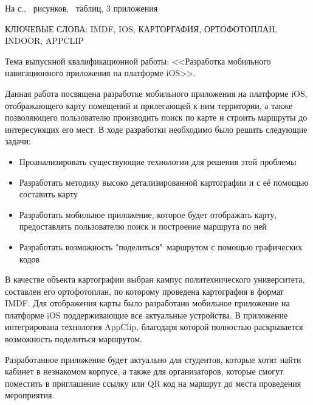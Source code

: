 \noindent На \pageref{LastPage} с., \totalfigures\ рисунков, \totaltables\ таблиц, 3 приложения

\MakeUppercase{
  ключевые слова: imdf, ios, карторгафия, ортофотоплан, indoor, appclip
}

Тема выпускной квалификационной работы: <<Разработка мобильного навигационного приложения на платформе iOS>>.

Данная работа посвящена разработке мобильного приложения на платформе iOS, отображающего карту помещений и прилегающей к ним территории, а также позволяющего пользователю производить поиск по карте и строить маршруты до интересующих его мест.
В ходе разработки необходимо было решить следующие задачи:
\begin{itemize}
  \item Проанализировать существующие технологии для решения этой проблемы
  \item Разработать методику высоко детализированной картографии и с её помощью составить карту
  \item Разработать мобильное приложение, которое будет отображать карту, предоставлять пользователю поиск и построение маршрута по ней
  \item Разработать возможность "поделиться"\ маршрутом с помощью графических кодов
\end{itemize}

В качестве объекта картографии выбран кампус политехнического университета, составлен его ортофотоплан, по которому проведена картография в формат IMDF. Для отображения карты было разработано мобильное приложение на платформе iOS поддерживающие все актуальные устройства. В приложение интегрирована технология AppClip, благодаря которой полностью раскрывается возможность поделиться маршрутом.

Разработанное приложение будет актуально для студентов, которые хотят найти кабинет в незнакомом корпусе, а также для организаторов, которые смогут поместить в приглашение ссылку или QR код на маршрут до места проведения мероприятия.
